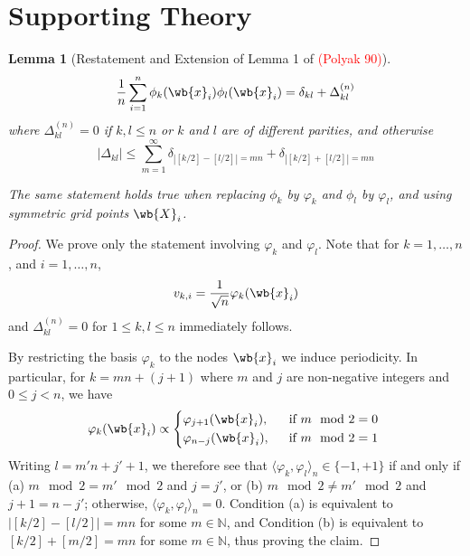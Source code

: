 \documentclass{article}
\newcommand{\abs}[1]{\left \lvert #1 \right \rvert}
\newcommand{\1}{\mathbf{1}}
\newcommand{\Nbb}{\mathbb{N}}
\newcommand{\dotp}[2]{\langle #1, #2 \rangle}
\theoremstyle{alden}
\theoremstyle{aldenthm}
\newtheorem{lemma}{Lemma}
\theoremstyle{definition}
\theoremstyle{remark}
\begin{document}
\section{Supporting Theory}
\begin{lemma}[Restatement and Extension of Lemma 1 of \textcolor{red}{(Polyak 90)}]
	\label{lem:polyak90}
	\begin{equation*}
	\frac{1}{n}\sum_{i = 1}^{n} \phi_{k}(\wb{x}_i)\phi_{l}(\wb{x}_i) = \delta_{kl} + \Delta_{kl}^{(n)}
	\end{equation*}
	where $\Delta_{kl}^{(n)} = 0$ if $k,l \leq n$ or $k$ and $l$ are of different parities, and otherwise
	\begin{equation*}
	\abs{\Delta_{kl}} \leq \sum_{m = 1}^{\infty} \delta_{\abs{[k/2] - [l/2]} = mn} + \delta_{\abs{[k/2] + [l/2]} = mn}
	\end{equation*}
	
	The same statement holds true when replacing $\phi_k$ by $\varphi_k$ and $\phi_l$ by $\varphi_l$, and using symmetric grid points $\wb{X}_i$.
\end{lemma}
\begin{proof}
	We prove only the statement involving $\varphi_k$ and $\varphi_l$. Note that for $k = 1,\ldots,n$, and $i = 1,\ldots,n$,
	\begin{equation*}
	v_{k,i} = \frac{1}{\sqrt{n}}\varphi_k(\wb{x}_i)
	\end{equation*}
	and $\Delta_{kl}^{(n)} = 0$ for $1 \leq k,l \leq n$ immediately follows. 
	
	By restricting the basis $\varphi_k$ to the nodes $\wb{x}_i$ we induce periodicity. In particular, for $k = mn + (j + 1)$ where $m$ and $j$ are non-negative integers and $0 \leq j < n$, we have
	\begin{equation*}
	\varphi_k(\wb{x}_i) \propto
	\begin{cases*}
	\varphi_{j + 1}(\wb{x}_i),& ~~\textrm{if $m \mod 2 = 0$} \\
	\varphi_{n - j}(\wb{x}_i),& ~~\textrm{if $m \mod 2 = 1$}
	\end{cases*}
	\end{equation*}
	Writing $l = m'n + j' + 1$, we therefore see that $\dotp{\varphi_k}{\varphi_l}_n \in \{-1,+1\}$ if and only if (a) $m \mod 2 = m' \mod 2$ and $j = j'$, or (b) $m \mod 2 \neq m' \mod 2$ and $j + 1 = n - j'$; otherwise, $\dotp{\varphi_k}{\varphi_l}_n = 0$. Condition (a) is equivalent to $|[k/2] - [l/2]| = mn$ for some $m \in \mathbb{N}$, and Condition (b) is equivalent to $[k/2] + [m/2] = mn$ for some $m \in \Nbb$, thus proving the claim.
	
\end{proof}
\end{document}
